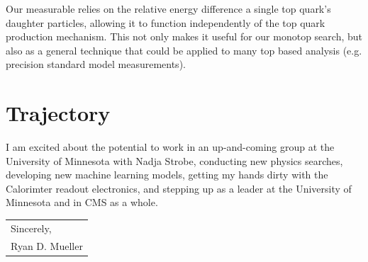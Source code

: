\documentclass[11pt]{article}
\begin{document}
Our measurable relies on the relative energy difference a single top quark's daughter particles, allowing it to function independently of the top quark production mechanism. This not only makes it useful for our monotop search, but also as a general technique that could be applied to many top based analysis (e.g. precision standard model measurements). 

\section{Trajectory}


I am excited about the potential to work in an up-and-coming group at the University of Minnesota with Nadja Strobe, conducting new physics searches, developing new machine learning models, getting my hands dirty with the Calorimter readout electronics, and stepping up as a leader at the University of Minnesota and in CMS as a whole.



\bigskip

\begin{tabular}{@{}l@{}}
Sincerely, \\
  [.4em]
  Ryan D. Mueller
\end{tabular}


\medskip

\printbibliography
\end{document}
